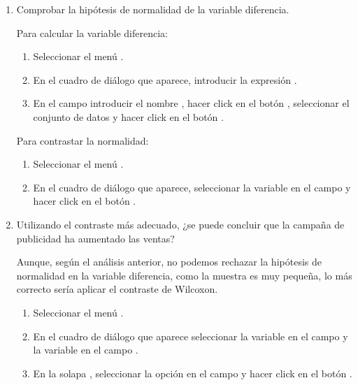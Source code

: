 \begin{enumerate}[leftmargin=*]
\begin{enumerate}
\item Comprobar la hipótesis de normalidad de la variable diferencia.
\begin{indicacion}{
Para calcular la variable diferencia:
\begin{enumerate}
\item Seleccionar el menú .
\item En el cuadro de diálogo que aparece, introducir la expresión .
\item En el campo  introducir el nombre , hacer click en el botón
, seleccionar el conjunto de datos  y hacer click en el botón .
\end{enumerate}
Para contrastar la normalidad:
\begin{enumerate}
\item Seleccionar el menú .
\item En el cuadro de diálogo que aparece, seleccionar la variable  en el campo  y
hacer click en el botón .
\end{enumerate}
}
\end{indicacion}

\item Utilizando el contraste más adecuado, ¿se puede concluir que la campaña de publicidad ha aumentado las ventas?
\begin{indicacion}
{Aunque, según el análisis anterior, no podemos rechazar la hipótesis de normalidad en la variable diferencia, como la
muestra es muy pequeña, lo más correcto sería aplicar el contraste de Wilcoxon.
\begin{enumerate}
\item Seleccionar el menú .
\item En el cuadro de diálogo que aparece seleccionar la variable  en el campo  y la variable
 en el campo .
\item En la solapa , seleccionar la opción  en el campo  y hacer click en el botón .
\end{enumerate}
}
\end{indicacion}
\end{enumerate}



\end{enumerate}
